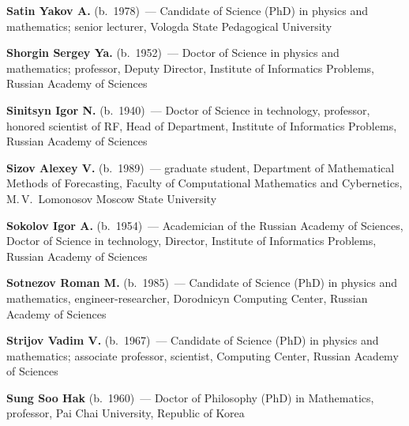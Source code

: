 \begin{multicols}{2}
\vspace*{4pt}

\noindent
\textbf{Satin Yakov A.} (b.\ 1978)~--- Candidate of Science (PhD) in physics 
and mathematics; senior lecturer, Vologda State Pedagogical University

\vspace*{4pt}


\noindent
\textbf{Shorgin Sergey Ya.} (b.\ 1952)~--- Doctor of Science in physics 
and mathematics; professor, Deputy Director,
Institute of Informatics Problems, Russian Academy of Sciences

\vspace*{4pt}

\noindent
\textbf{Sinitsyn Igor N.} (b.\ 1940)~--- Doctor of Science in technology, 
professor, honored scientist of RF, Head of Department,
Institute of Informatics Problems, Russian Academy of Sciences

\vspace*{4pt}

\noindent
\textbf{Sizov Alexey V.} (b.\ 1989)~--- 
graduate student,
Department of Mathematical Methods of Forecasting,
Faculty of Computational Mathematics and Cybernetics, 
M.\,V.~Lomonosov Moscow State University

\vspace*{4pt}

\noindent 
\textbf{Sokolov Igor A.} (b.\ 1954)~--- Academician of the Russian Academy of Sciences,
Doctor of Science in technology, Director,
Institute of Informatics Problems,  Russian Academy of Sciences


\vspace*{4pt}

\noindent
\textbf{Sotnezov Roman M.} (b.\ 1985)~--- 
Candidate of Science (PhD) in physics and mathematics, engineer-researcher,
Dorodnicyn Computing Center, Russian Academy of Sciences 

\pagebreak

\noindent
\textbf{Strijov Vadim V.} (b.\ 1967)~--- Candidate of Science (PhD)
in physics  and mathematics; associate professor, scientist, Computing Center, 
Russian Academy of Sciences

\vspace*{4pt}

\noindent
\textbf{Sung Soo Hak} (b.\ 1960)~--- Doctor of Philosophy (PhD) in Mathematics,
professor, Pai Chai University, Republic of Korea

\vspace*{4pt}


\end{multicols}
